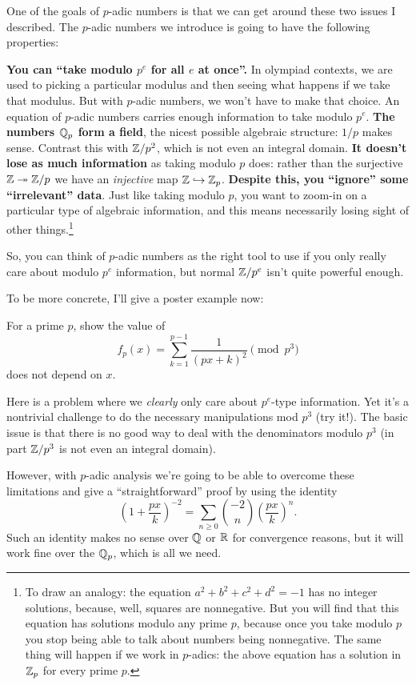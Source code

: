 One of the goals of $p$-adic numbers is that we can get around
these two issues I described.
The $p$-adic numbers we introduce is going to have the following properties:
\begin{enumerate}
	\ii \textbf{You can ``take modulo $p^e$ for all $e$ at once''.}
	In olympiad contexts, we are used to picking a particular modulus and then
	seeing what happens if we take that modulus.
	But with $p$-adic numbers, we won't have to make that choice.
	An equation of $p$-adic numbers carries enough information
	to take modulo $p^e$.
	\ii \textbf{The numbers $\mathbb Q_p$ form a field},
	the nicest possible algebraic structure:
	$1/p$ makes sense.
	Contrast this with $\mathbb Z/p^2$, which is not even an integral domain.
	\ii \textbf{It doesn't lose as much information}
	as taking modulo $p$ does:
	rather than the surjective $\mathbb Z \twoheadrightarrow \mathbb Z/p$ we have an
	\emph{injective} map $\mathbb Z \hookrightarrow \mathbb Z_p$.
	\ii \textbf{Despite this, you ``ignore'' some ``irrelevant'' data}.
	Just like taking modulo $p$, you want to zoom-in on
	a particular type of algebraic information,
	and this means necessarily
	losing sight of other things.\footnote{To draw an analogy: the equation
	$ a^2 + b^2 + c^2 + d^2 = -1$
	has no integer solutions, because, well, squares are nonnegative.
	But you will find that this equation has solutions modulo any prime $p$,
	because once you take modulo $p$ you stop being able to
	talk about numbers being nonnegative.
	The same thing will happen if we work in $p$-adics:
	the above equation has a solution in $\mathbb Z_p$ for every prime $p$.}
\end{enumerate}
So, you can think of $p$-adic numbers as the right tool to use
if you only really care about modulo $p^e$ information,
but normal $\mathbb Z/p^e$ isn't quite powerful enough.

To be more concrete, I'll give a poster example now:
\begin{example}
	For a prime $p$, show the value of
	\[ f_p(x) = \sum_{k=1}^{p-1} \frac{1}{(px+k)^2} \pmod{p^3} \]
	does not depend on $x$.
	\label{ex:token}
\end{example}
Here is a problem where we \emph{clearly} only care
about $p^e$-type information.
Yet it's a nontrivial challenge to do the
necessary manipulations mod $p^3$ (try it!).
The basic issue is that there is no good way to deal with
the denominators modulo $p^3$
(in part $\mathbb Z/p^3$ is not even an integral domain).

However, with $p$-adic analysis we're going to be able
to overcome these limitations and give a ``straightforward'' proof
by using the identity
\[
	\left( 1 + \frac{px}{k} \right)^{-2}
	= \sum_{n \ge 0} \binom{-2}{n} \left( \frac{px}{k} \right)^n.
\]
Such an identity makes no sense over $\mathbb Q$ or $\mathbb R$
for convergence reasons,
but it will work fine over the $\mathbb Q_p$, which is all we need.


